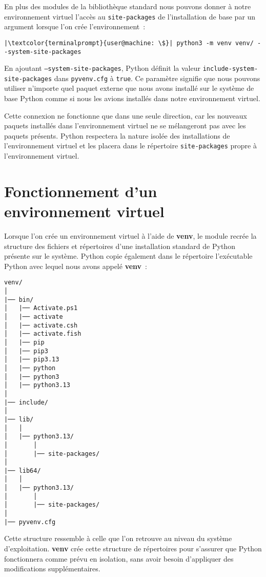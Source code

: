 En plus des modules de la bibliothèque standard nous pouvons donner à notre environnement virtuel l’accès au \texttt{site-packages} de l’installation de base par un argument lorsque l'on crée l’environnement :
\begin{lstlisting}[style=terminal]
|\textcolor{terminalprompt}{user@machine: \$}| python3 -m venv venv/ --system-site-packages
\end{lstlisting}

En ajoutant \texttt{--system-site-packages}, Python définit la valeur \texttt{include-system-}\\
\texttt{site-packages} dans \texttt{pyvenv.cfg} à \texttt{true}. Ce paramètre signifie que nous pouvons utiliser n’importe quel paquet externe que nous avons installé sur le système de base Python comme si nous les avions installés dans notre environnement virtuel.

Cette connexion ne fonctionne que dans une seule direction, car les nouveaux paquets installés dans l'environnement virtuel ne se mélangeront pas avec les paquets présents. Python respectera la nature isolée des installations de l'environnement virtuel et les placera dans le répertoire \texttt{site-packages} propre à l’environnement virtuel.

\section{Fonctionnement d'un environnement virtuel}

Lorsque l'on crée un environnement virtuel à l’aide de \textbf{venv}, le module recrée la structure des fichiers et répertoires d’une installation standard de Python présente sur le système. Python copie également dans le répertoire l’exécutable Python avec lequel nous avons appelé \textbf{venv} :
\begin{verbatim}
venv/
│
|── bin/
│   |── Activate.ps1
│   |── activate
│   |── activate.csh
│   |── activate.fish
│   |── pip
│   |── pip3
│   |── pip3.13
│   |── python
│   |── python3
│   |── python3.13
│
|── include/
│
|── lib/
│   │
│   |── python3.13/
│       │
│       |── site-packages/
│
|── lib64/
│   │
│   |── python3.13/
│       │
│       |── site-packages/
│
|── pyvenv.cfg
\end{verbatim}

Cette structure ressemble à celle que l'on retrouve au niveau du système d'exploitation. \textbf{venv} crée cette structure de répertoires pour s’assurer que Python fonctionnera comme prévu en isolation, sans avoir besoin d’appliquer des modifications supplémentaires. 

